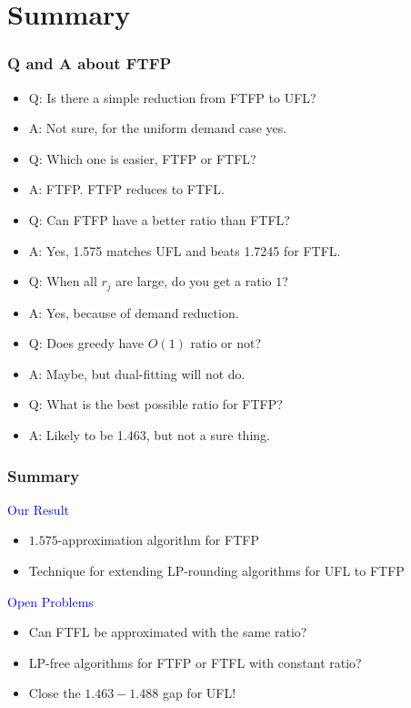 \documentclass[hyperref,dvipsnames,svgnames,compress]{beamer}
\begin{document}
\section[End]{Summary}
\begin{frame}
  \frametitle{Q and A about FTFP}
  \begin{itemize}
  \item \color{red}
    Q: Is there a simple reduction from FTFP to UFL?
  \item<2,8> \color{blue}
    A: Not sure, for the uniform demand case yes.
  \item \color{red}
    Q: Which one is easier, FTFP or FTFL?
  \item<3,8> \color{blue}
    A: FTFP. FTFP reduces to FTFL.
  \item \color{red}
    Q: Can FTFP have a better ratio than FTFL?
  \item<4,8> \color{blue}
    A: Yes, 1.575 matches UFL and beats 1.7245 for FTFL.
  \item \color{red}
    Q: When all $r_j$ are large, do you get a ratio $1$?
  \item<5,8> \color{blue}
    A: Yes, because of demand reduction.
  \item \color{red}
    Q: Does greedy have $O(1)$ ratio or not?
  \item<6,8> \color{blue}
    A: Maybe, but dual-fitting will not do.
  \item \color{red}
    Q: What is the best possible ratio for FTFP?
  \item<7,8> \color{blue}
    A: Likely to be 1.463, but not a sure thing.
 \end{itemize}
\end{frame}

\begin{frame}
  \frametitle{Summary}
  
{\large
  {\textcolor{blue}{Our Result}}

  \begin{itemize}
  	\item $1.575$-approximation algorithm for FTFP
	\item Technique for extending LP-rounding algorithms for UFL to FTFP
  \end{itemize}

\vspace{0.2in}
\pause
  {\textcolor{blue}{Open Problems}}

  \begin{itemize}
  \item Can FTFL be approximated with the same ratio?
  \item LP-free algorithms for FTFP or FTFL with constant ratio?
  \item Close the $1.463-1.488$ gap for UFL!
  \end{itemize}
}

\end{frame}
\end{document}
